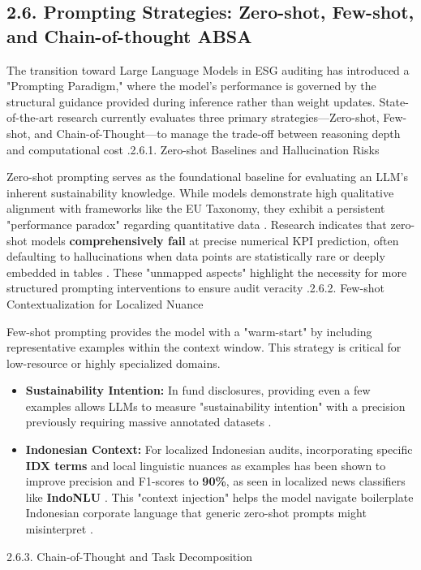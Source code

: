 \documentclass{article}
\begin{document}
\subsection*{2.6. Prompting Strategies: Zero-shot, Few-shot, and Chain-of-thought ABSA}

The transition toward Large Language Models in ESG auditing has introduced a "Prompting Paradigm," where the model's performance is governed by the structural guidance provided during inference rather than weight updates. State-of-the-art research currently evaluates three primary strategies—Zero-shot, Few-shot, and Chain-of-Thought—to manage the trade-off between reasoning depth and computational cost  \parencite[]{siqi_sun_f6a51152, yi_zou_37c055f7, yilei_zhao_b7bbd9c8}.2.6.1. Zero-shot Baselines and Hallucination Risks

Zero-shot prompting serves as the foundational baseline for evaluating an LLM's inherent sustainability knowledge. While models demonstrate high qualitative alignment with frameworks like the EU Taxonomy, they exhibit a persistent "performance paradox" regarding quantitative data  \parencite{jonathan_schmoll_931ab217}. Research indicates that zero-shot models \textbf{comprehensively fail} at precise numerical KPI prediction, often defaulting to hallucinations when data points are statistically rare or deeply embedded in tables  \parencite[]{siqi_sun_f6a51152, jonathan_schmoll_931ab217}. These "unmapped aspects" highlight the necessity for more structured prompting interventions to ensure audit veracity  \parencite{jonathan_schmoll_931ab217}.2.6.2. Few-shot Contextualization for Localized Nuance

Few-shot prompting provides the model with a "warm-start" by including representative examples within the context window. This strategy is critical for low-resource or highly specialized domains.
\begin{itemize}
\item 

\textbf{Sustainability Intention:} In fund disclosures, providing even a few examples allows LLMs to measure "sustainability intention" with a precision previously requiring massive annotated datasets  \parencite{mayank_singh_e3f387f5}.\item 

\textbf{Indonesian Context:} For localized Indonesian audits, incorporating specific \textbf{IDX terms} and local linguistic nuances as examples has been shown to improve precision and F1-scores to \textbf{90\%}, as seen in localized news classifiers like \textbf{IndoNLU}  \parencite{muhammad_riza_alifi_66b78fb0}. This "context injection" helps the model navigate boilerplate Indonesian corporate language that generic zero-shot prompts might misinterpret  \parencite[]{muhammad_riza_alifi_66b78fb0, anisa_kusuma_putri_4109a23b}.
\end{itemize}2.6.3. Chain-of-Thought and Task Decomposition
\end{document}
